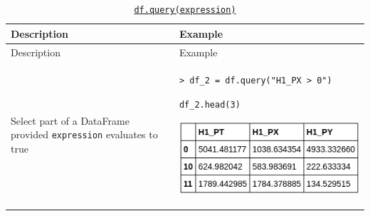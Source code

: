 \documentclass[10pt,a4paperpaper,]{article}
\begin{document}
\begin{longtable}[]{@{}ll@{}}
\caption{\href{http://pandas.pydata.org/pandas-docs/stable/generated/pandas.DataFrame.query.html}{\texttt{df.query(expression)}}}\tabularnewline
\toprule
\begin{minipage}[b]{0.47\columnwidth}\raggedright\strut
Description
\strut\end{minipage} &
\begin{minipage}[b]{0.47\columnwidth}\raggedright\strut
Example
\strut\end{minipage}\tabularnewline
\midrule
\endfirsthead
\toprule
\begin{minipage}[b]{0.47\columnwidth}\raggedright\strut
Description
\strut\end{minipage} &
\begin{minipage}[b]{0.47\columnwidth}\raggedright\strut
Example
\strut\end{minipage}\tabularnewline
\midrule
\endhead
\begin{minipage}[t]{0.47\columnwidth}\raggedright\strut
Select part of a DataFrame provided \texttt{expression} evaluates to
true
\strut\end{minipage} &
\begin{minipage}[t]{0.47\columnwidth}\raggedright\strut
\texttt{\textgreater{}\ df\_2\ =\ df.query("H1\_PX\ \textgreater{}\ 0")}

\texttt{df\_2.head(3)}

\includegraphics[width=\textwidth]{assets/06-query.png}
\strut\end{minipage}\tabularnewline
\bottomrule
\end{longtable}
\end{document}
